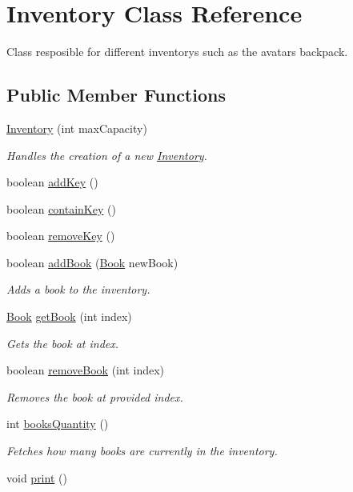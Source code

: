 \hypertarget{classInventory}{}\section{Inventory Class Reference}
\label{classInventory}


Class resposible for different inventorys such as the avatars backpack.  


\subsection*{Public Member Functions}
\begin{DoxyCompactItemize}
\item 
\hyperlink{classInventory_a0c1b37cfe68e9826b61ceadd9e360744}{Inventory} (int max\+Capacity)
\begin{DoxyCompactList}\small\item\em Handles the creation of a new \hyperlink{classInventory}{Inventory}. \end{DoxyCompactList}\item 
boolean \hyperlink{classInventory_ae88a0b1d1058d925daa87a5a8c514d55}{add\+Key} ()
\item 
boolean \hyperlink{classInventory_a2f51b9650e3b6b72c790ce70af2807b4}{contain\+Key} ()
\item 
boolean \hyperlink{classInventory_a650574968bd49dd7f530d9be365b1eac}{remove\+Key} ()
\item 
boolean \hyperlink{classInventory_a9b72524737dae6d453a5a3e34732c8d8}{add\+Book} (\hyperlink{classBook}{Book} new\+Book)
\begin{DoxyCompactList}\small\item\em Adds a book to the inventory. \end{DoxyCompactList}\item 
\hyperlink{classBook}{Book} \hyperlink{classInventory_a2401c8b134a26ce2f50b70a0d913a5af}{get\+Book} (int index)
\begin{DoxyCompactList}\small\item\em Gets the book at index. \end{DoxyCompactList}\item 
boolean \hyperlink{classInventory_a79e7dfaa4acec1562a8eca51f4935146}{remove\+Book} (int index)
\begin{DoxyCompactList}\small\item\em Removes the book at provided index. \end{DoxyCompactList}\item 
int \hyperlink{classInventory_ac663a5a8da5d711b8bc158193114f0e6}{books\+Quantity} ()
\begin{DoxyCompactList}\small\item\em Fetches how many books are currently in the inventory. \end{DoxyCompactList}\item 
void \hyperlink{classInventory_a6965b4166b280d887b8c54c6c46b099b}{print} ()
\end{DoxyCompactItemize}


